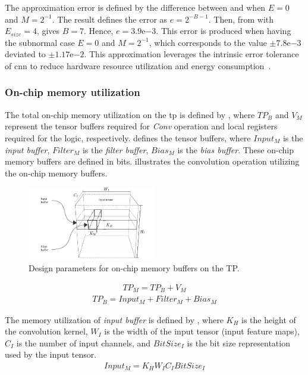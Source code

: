 The approximation error is defined by the difference between  and  when $E=0$ and $M=2^{-1}$. The result defines the error as $e=2^{-B-1}$. Then, from  with $E_{size}=4$, gives $B=7$. Hence, $e=3.9\mathrm{e}{-3}$. This error is produced when having the subnormal case $E=0$ and $M=2^{-1}$, which corresponds to the value $\pm7.8\mathrm{e}{-3}$ deviated to $\pm1.17\mathrm{e}{-2}$. This approximation leverages the intrinsic error tolerance of \gls{cnn} to reduce hardware resource utilization and energy consumption~\cite{du2014leveraging}.


\subsubsection{On-chip memory utilization}
\label{sec:memory_utilization}
The total on-chip memory utilization on the \gls{tp} is defined by , where $TP_B$ and $V_{M}$ represent the tensor buffers required for \emph{Conv} operation and local registers required for the logic, respectively.  defines the tensor buffers, where $Input_{M}$ is the \emph{input buffer}, $Filter_{M}$ is the \emph{filter buffer}, $Bias_{M}$ is the \emph{bias buffer}. These on-chip memory buffers are defined in bits.  illustrates the convolution operation utilizing the on-chip memory buffers.
\begin{figure}
	\centering
	\includegraphics[width=0.5\textwidth]{./chapters/cnn_accelerator/figures/accelerator_buffers.pdf}
	\caption{Design parameters for on-chip memory buffers on the TP.}
	\label{fig:accelerator_buffers}
\end{figure}
\begin{eqnarray} \label{eq:tp_memory}
TP_{M}=TP_B+V_{M}
\end{eqnarray}
\begin{eqnarray} \label{eq:tp_memory_buffer}
TP_{B}=Input_{M}+Filter_{M}+Bias_{M}
\end{eqnarray}

The memory utilization of \emph{input buffer} is defined by , where $K_{H}$ is the height of the convolution kernel, $W_{I}$ is the width of the input tensor (input feature maps), $C_{I}$ is the number of input channels, and $BitSize_{I}$ is the bit size representation used by the input tensor.
\begin{eqnarray} \label{eq:input_memory}
Input_{M}=K_{H}W_{I}C_{I}BitSize_{I}
\end{eqnarray}

